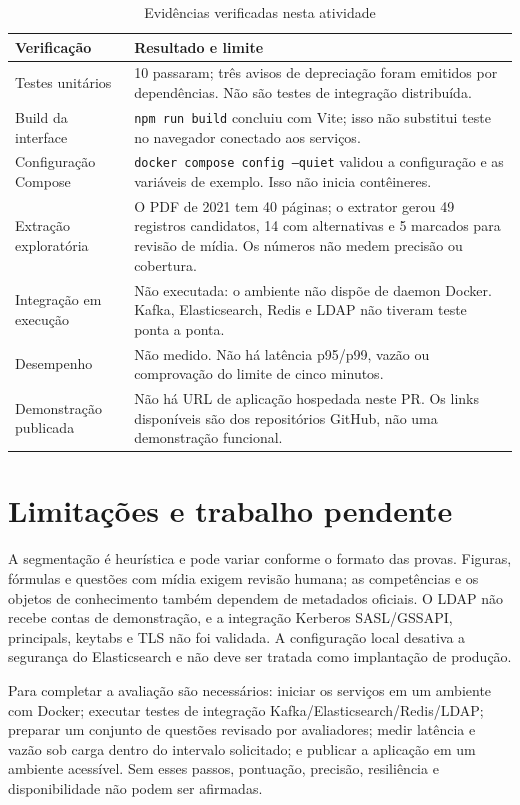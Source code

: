 \documentclass[12pt]{article}
\begin{document}
\begin{table}[ht]
\centering
\caption{Evidências verificadas nesta atividade}
\label{tab:evidencias}
\small
\begin{tabular}{|p{}|p{}|}
\hline
\textbf{Verificação} & \textbf{Resultado e limite} \\
\hline
Testes unitários & 10 passaram; três avisos de depreciação foram emitidos por dependências. Não são testes de integração distribuída. \\
\hline
Build da interface & \texttt{npm run build} concluiu com Vite; isso não substitui teste no navegador conectado aos serviços. \\
\hline
Configuração Compose & \texttt{docker compose config --quiet} validou a configuração e as variáveis de exemplo. Isso não inicia contêineres. \\
\hline
Extração exploratória & O PDF de 2021 tem 40 páginas; o extrator gerou 49 registros candidatos, 14 com alternativas e 5 marcados para revisão de mídia. Os números não medem precisão ou cobertura. \\
\hline
Integração em execução & Não executada: o ambiente não dispõe de daemon Docker. Kafka, Elasticsearch, Redis e LDAP não tiveram teste ponta a ponta. \\
\hline
Desempenho & Não medido. Não há latência p95/p99, vazão ou comprovação do limite de cinco minutos. \\
\hline
Demonstração publicada & Não há URL de aplicação hospedada neste PR. Os links disponíveis são dos repositórios GitHub, não uma demonstração funcional. \\
\hline
\end{tabular}
\end{table}

\section{Limitações e trabalho pendente}

A segmentação é heurística e pode variar conforme o formato das provas. Figuras, fórmulas e questões com mídia exigem revisão humana; as competências e os objetos de conhecimento também dependem de metadados oficiais. O LDAP não recebe contas de demonstração, e a integração Kerberos SASL/GSSAPI, principals, keytabs e TLS não foi validada. A configuração local desativa a segurança do Elasticsearch e não deve ser tratada como implantação de produção.

Para completar a avaliação são necessários: iniciar os serviços em um ambiente com Docker; executar testes de integração Kafka/Elasticsearch/Redis/LDAP; preparar um conjunto de questões revisado por avaliadores; medir latência e vazão sob carga dentro do intervalo solicitado; e publicar a aplicação em um ambiente acessível. Sem esses passos, pontuação, precisão, resiliência e disponibilidade não podem ser afirmadas.
\end{document}

